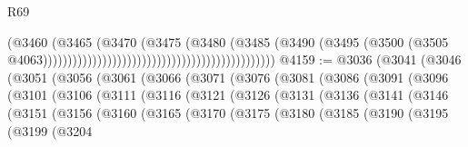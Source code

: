 \begin{lexlean}{R69}
\begin{coremodule}
{                                                                              (@3460
                                                                                (@3465
                                                                                  (@3470
                                                                                    (@3475
                                                                                      (@3480
                                                                                        (@3485
                                                                                          (@3490
                                                                                            (@3495
                                                                                              (@3500
                                                                                                (@3505
                                                                                                  @4063)))))))))))))))))))))))))))))))))))))))))))))))
@4159 := @3036
    (@3041
      (@3046
        (@3051
          (@3056
            (@3061
              (@3066
                (@3071
                  (@3076
                    (@3081
                      (@3086
                        (@3091
                          (@3096
                            (@3101
                              (@3106
                                (@3111
                                  (@3116
                                    (@3121
                                      (@3126
                                        (@3131
                                          (@3136
                                            (@3141
                                              (@3146
                                                (@3151
                                                  (@3156
                                                    (@3160
                                                      (@3165
                                                        (@3170
                                                          (@3175
                                                            (@3180
                                                              (@3185
                                                                (@3190
                                                                  (@3195
                                                                    (@3199
                                                                      (@3204
}
\end{coremodule}
\end{lexlean}
